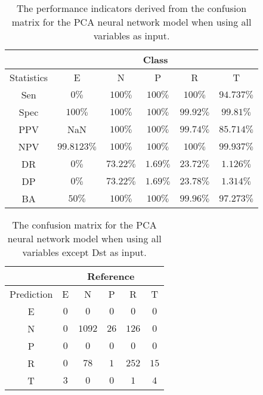 \begin{table}[!ht]
	\centering
	\begin{tabular}{|c|c|c|c|c|c|}
		\hline
		 & \multicolumn{5}{c|}{Class} \\ \hline
		Statistics & E & N & P & R & T \\ \hline
		Sen & $0\%$ & $100\%$ & $100\%$ & $100\%$ & $94.737\%$ \\ \hline
		Spec & $100\%$ & $100\%$ & $100\%$ & $99.92\%$ & $99.81\%$ \\ \hline
		PPV & NaN & $100\%$ & $100\%$ & $99.74\%$ & $85.714\%$ \\ \hline
		NPV & $99.8123\%$ & $100\%$ & $100\%$ & $100\%$ & $99.937\%$ \\ \hline
		DR & $0\%$ & $73.22\%$ & $1.69\%$ & $23.72\%$ & $1.126\%$ \\ \hline
		DP & $0\%$ & $73.22\%$ & $1.69\%$ & $23.78\%$ & $1.314\%$ \\ \hline
		BA & $50\%$ & $100\%$ & $100\%$ & $99.96\%$ & $97.273\%$ \\ \hline
	\end{tabular}
	\caption{The performance indicators derived from the confusion matrix for the PCA neural network model when using all variables as input.}
	\label{tab:cs:reverse:all:pcaNNet}
\end{table}

\begin{table}[!ht]
	\centering
	\begin{tabular}{|c|c|c|c|c|c|}
		\hline
		 & \multicolumn{5}{|c|}{Reference} \\ \hline
		 Prediction & E & N & P & R & T \\ \hline
		 E & $0$ & $0$ & $0$ & $0$ & $0$ \\ \hline
		 N & $0$ & $1092$ & $26$ & $126$ & $0$ \\ \hline
		 P & $0$ & $0$ & $0$ & $0$ & $0$ \\ \hline
		 R & $0$ & $78$ & $1$ & $252$ & $15$ \\ \hline
		 T & $3$ & $0$ & $0$ & $1$ & $4$ \\ \hline
	\end{tabular}
	\caption{The confusion matrix for the PCA neural network model when using all variables except Dst as input.}
	\label{tab:cm:noDst:pcaNNet}
\end{table}

